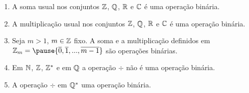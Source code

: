 \documentclass{beamer}
\begin{document}
    \begin{frame}
        \begin{exemplos}
            \begin{enumerate}[label={\arabic*})]
                \item A soma usual \pause nos conjuntos $\mathbb{Z}$, \pause $\mathbb{Q}$, \pause $\mathbb{R}$ \pause e $\mathbb{C}$ \pause
                    {\'e} uma opera{\c c}{\~a}o bin{\'a}ria.\pause

                \vspace{.3cm}

                \item A multiplica\c{c}\~ao usual \pause nos conjuntos $\mathbb{Z}$, \pause $\mathbb{Q}$, \pause $\mathbb{R}$ \pause e
                    $\mathbb{C}$ {\'e} uma opera{\c c}{\~a}o bin{\'a}ria.\pause

                \vspace{.3cm}

                \item Seja $m > 1$, \pause $m \in \mathbb{Z}$ fixo. \pause A soma \pause e a multiplica\c{c}\~ao definidos em
                    $\z_m = \pause \{\overline{0}, \overline{1}, ..., \overline{m-1}\}$ \pause s\~ao opera\c{c}\~oes
                    bin\'arias.\pause

                \vspace{.3cm}

                \item Em $\mathbb{N}$, \pause $\mathbb{Z}$, \pause $\mathbb{Z}^{*}$ \pause e em $\mathbb{Q}$ \pause a opera\c{c}\~ao $\div$
                    \pause n{\~a}o {\'e} uma opera{\c c}{\~a}o bin{\'a}ria.

                \vspace{.3cm}

                \item A opera\c{c}\~ao $\div$ \pause em $\mathbb{Q}^{*}$  uma opera{\c c}{\~a}o bin{\'a}ria.\pause

                \vspace{.3cm}

            \end{enumerate}
        \end{exemplos}
    \end{frame}
\end{document}

